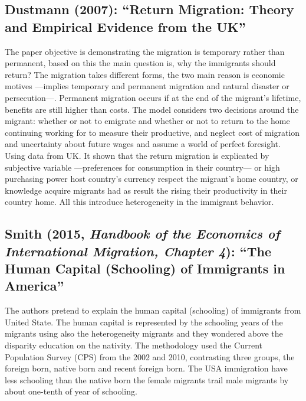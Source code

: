 \documentclass[11pt]{article}
\theoremstyle{prop}
\begin{document}
	\subsection{Dustmann (2007): ``Return Migration: Theory and Empirical Evidence from the UK''}
	The paper objective is demonstrating the migration is temporary rather than permanent, based on this the main question is, why the immigrants should return? The migration takes different forms, the two main reason is economic motives —implies temporary and permanent migration and natural disaster or persecution—. Permanent migration occurs if at the end of the migrant’s lifetime, benefits are still higher than costs.
	The model considers two decisions around the migrant: whether or not to emigrate and whether or not to return to the home continuing working for to measure their productive, and neglect cost of migration and uncertainty about future wages and assume a world of perfect foresight.
	Using data from UK. It shown that the return migration is explicated by subjective variable —preferences for consumption in their country— or high purchasing power host country’s currency respect the migrant’s home country, or knowledge acquire migrants had as result the rising their productivity in their country home. All this introduce heterogeneity in the immigrant behavior. 
	
	\subsection{Smith (2015, \textit{Handbook of the Economics of International Migration, Chapter 4}): ``The Human Capital (Schooling) of Immigrants in America''}
	The authors pretend to explain the human capital (schooling) of immigrants from United State. The human capital is represented by the schooling years of the migrants using also the heterogeneity migrants and they wondered above the disparity education on the nativity. 
	The methodology used the Current Population Survey (CPS) from the 2002 and 2010, contrasting three groups, the foreign born, native born and recent foreign born. The USA immigration have less schooling than the native born the female migrants trail male migrants by about one-tenth of year of schooling. 
	
\end{document}
